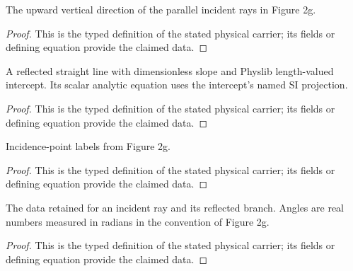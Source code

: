 \begin{definition}
  \label{def:physics:IPhO_2026_2_C_2:aux003}
  The upward vertical direction of the parallel incident rays in Figure 2g.
\end{definition}
\begin{proof}
  This is the typed definition of the stated physical carrier; its fields or defining equation provide the claimed data.
\end{proof}

\begin{definition}
  \label{def:physics:IPhO_2026_2_C_2:aux004}
  A reflected straight line with dimensionless slope and Physlib
  length-valued intercept.  Its scalar analytic equation uses the intercept's
  named SI projection.
\end{definition}
\begin{proof}
  This is the typed definition of the stated physical carrier; its fields or defining equation provide the claimed data.
\end{proof}

\begin{definition}
  \label{def:physics:IPhO_2026_2_C_2:aux005}
  Incidence-point labels from Figure 2g.
\end{definition}
\begin{proof}
  This is the typed definition of the stated physical carrier; its fields or defining equation provide the claimed data.
\end{proof}

\begin{definition}
  \label{def:physics:IPhO_2026_2_C_2:aux006}
  The data retained for an incident ray and its reflected branch. Angles are real numbers measured in radians in the convention of Figure 2g.
\end{definition}
\begin{proof}
  This is the typed definition of the stated physical carrier; its fields or defining equation provide the claimed data.
\end{proof}

